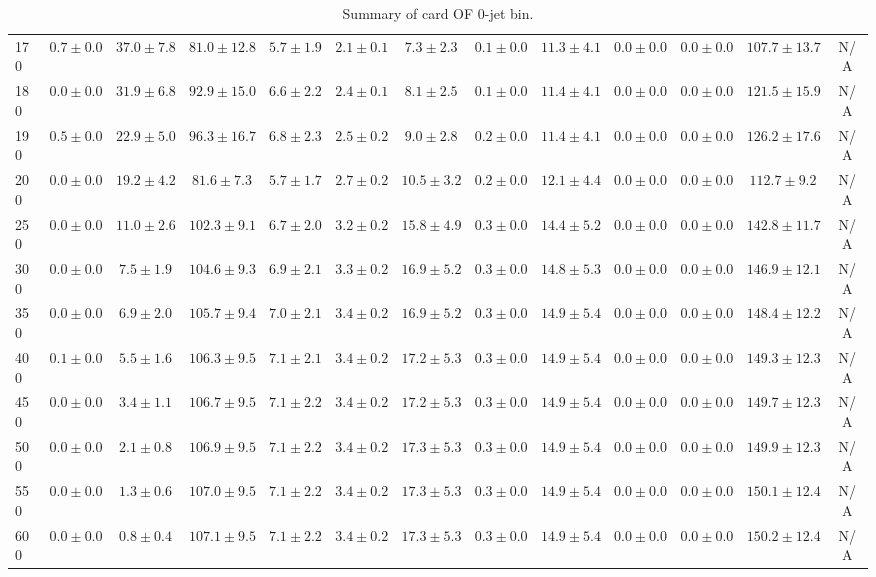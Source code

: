 \begin{table}
{\begin{center}
\begin{tabular}{l | c c | c c c c c c c c  | c c}
170 & $0.7\pm0.0$ & $37.0\pm7.8$ & $81.0\pm12.8$ & $5.7\pm1.9$ & $2.1\pm0.1$ & $7.3\pm2.3$ & $0.1\pm0.0$ & $11.3\pm4.1$ & $0.0\pm0.0$ & $0.0\pm0.0$ & $107.7\pm13.7$ &  N/A \\
180 & $0.0\pm0.0$ & $31.9\pm6.8$ & $92.9\pm15.0$ & $6.6\pm2.2$ & $2.4\pm0.1$ & $8.1\pm2.5$ & $0.1\pm0.0$ & $11.4\pm4.1$ & $0.0\pm0.0$ & $0.0\pm0.0$ & $121.5\pm15.9$ & N/A \\
190 & $0.5\pm0.0$ & $22.9\pm5.0$ & $96.3\pm16.7$ & $6.8\pm2.3$ & $2.5\pm0.2$ & $9.0\pm2.8$ & $0.2\pm0.0$ & $11.4\pm4.1$ & $0.0\pm0.0$ & $0.0\pm0.0$ & $126.2\pm17.6$ & N/A \\
200 & $0.0\pm0.0$ & $19.2\pm4.2$ & $81.6\pm7.3$ & $5.7\pm1.7$ & $2.7\pm0.2$ & $10.5\pm3.2$ & $0.2\pm0.0$ & $12.1\pm4.4$ & $0.0\pm0.0$ & $0.0\pm0.0$ & $112.7\pm9.2$ & N/A \\
250 & $0.0\pm0.0$ & $11.0\pm2.6$ & $102.3\pm9.1$ & $6.7\pm2.0$ & $3.2\pm0.2$ & $15.8\pm4.9$ & $0.3\pm0.0$ & $14.4\pm5.2$ & $0.0\pm0.0$ & $0.0\pm0.0$ & $142.8\pm11.7$ & N/A \\
300 & $0.0\pm0.0$ & $7.5\pm1.9$ & $104.6\pm9.3$ & $6.9\pm2.1$ & $3.3\pm0.2$ & $16.9\pm5.2$ & $0.3\pm0.0$ & $14.8\pm5.3$ & $0.0\pm0.0$ & $0.0\pm0.0$ & $146.9\pm12.1$ &  N/A \\
350 & $0.0\pm0.0$ & $6.9\pm2.0$ & $105.7\pm9.4$ & $7.0\pm2.1$ & $3.4\pm0.2$ & $16.9\pm5.2$ & $0.3\pm0.0$ & $14.9\pm5.4$ & $0.0\pm0.0$ & $0.0\pm0.0$ & $148.4\pm12.2$ &  N/A \\
400 & $0.1\pm0.0$ & $5.5\pm1.6$ & $106.3\pm9.5$ & $7.1\pm2.1$ & $3.4\pm0.2$ & $17.2\pm5.3$ & $0.3\pm0.0$ & $14.9\pm5.4$ & $0.0\pm0.0$ & $0.0\pm0.0$ & $149.3\pm12.3$ &  N/A \\
450 & $0.0\pm0.0$ & $3.4\pm1.1$ & $106.7\pm9.5$ & $7.1\pm2.2$ & $3.4\pm0.2$ & $17.2\pm5.3$ & $0.3\pm0.0$ & $14.9\pm5.4$ & $0.0\pm0.0$ & $0.0\pm0.0$ & $149.7\pm12.3$ &  N/A \\
500 & $0.0\pm0.0$ & $2.1\pm0.8$ & $106.9\pm9.5$ & $7.1\pm2.2$ & $3.4\pm0.2$ & $17.3\pm5.3$ & $0.3\pm0.0$ & $14.9\pm5.4$ & $0.0\pm0.0$ & $0.0\pm0.0$ & $149.9\pm12.3$ &  N/A \\
550 & $0.0\pm0.0$ & $1.3\pm0.6$ & $107.0\pm9.5$ & $7.1\pm2.2$ & $3.4\pm0.2$ & $17.3\pm5.3$ & $0.3\pm0.0$ & $14.9\pm5.4$ & $0.0\pm0.0$ & $0.0\pm0.0$ & $150.1\pm12.4$ &  N/A \\
600 & $0.0\pm0.0$ & $0.8\pm0.4$ & $107.1\pm9.5$ & $7.1\pm2.2$ & $3.4\pm0.2$ & $17.3\pm5.3$ & $0.3\pm0.0$ & $14.9\pm5.4$ & $0.0\pm0.0$ & $0.0\pm0.0$ & $150.2\pm12.4$ &  N/A \\
\hline
\end{tabular}
\end{center}
}
\caption{Summary of card OF 0-jet bin.}
\end{table}
